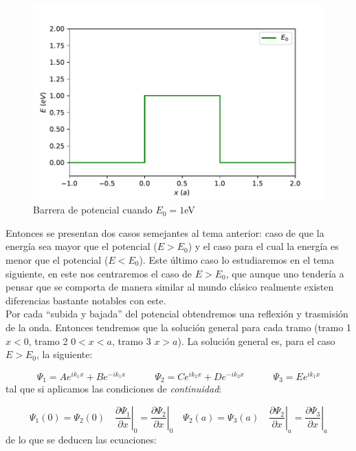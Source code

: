 \documentclass[12pt,a4paper]{article}
\numberwithin{equation}{section}
\numberwithin{figure}{section}
\newcommand{\parciales}[2]{\frac{\partial #1}{\partial #2}}
\newcommand{\tquad}{\quad \quad \quad}
\begin{document}
\begin{figure}[h!] \centering
\includegraphics[scale=0.7]{barrera-potencial.pdf}
\caption{Barrera de potencial cuando $E_0 = 1$eV}
\label{Fig:25.01-Barrera}
\end{figure}
 
Entonces se presentan dos casos semejantes al tema anterior: caso de que la energía sea mayor que el potencial ($E>E_0$) y el caso para el cual la energía es menor que el potencial ($E<E_0$). Este último caso lo estudiaremos en el tema siguiente, en este nos centraremos el caso de $E>E_0$, que aunque uno tendería a pensar que se comporta de manera similar al mundo clásico realmente existen diferencias bastante notables con este. \\

Por cada ``subida y bajada'' del potencial obtendremos una reflexión y trasmisión de la onda. Entonces tendremos que la solución general para cada tramo (tramo 1 $x<0$, tramo 2 $0<x<a$, tramo 3 $x>a$). La solución general es, para el caso $E>E_0$, la siguiente:

\begin{equation}
\Psi_1 = A e^{ik_1x} +  B e^{-ik_1x}  \tquad
\Psi_2 = C e^{ik_2x} +  D e^{-ik_2x}  \tquad
\Psi_3 = E e^{ik_1x} 
\end{equation}
tal que si aplicamos las condiciones de \textit{continuidad}:

\begin{equation}
\Psi_1 (0) = \Psi_2 (0) \quad \left. \parciales{\Psi_1}{x} \right|_0 = \left. \parciales{\Psi_2}{x} \right|_0  \quad 
\Psi_2 (a) = \Psi_3 (a) \quad \left. \parciales{\Psi_2}{x} \right|_a = \left. \parciales{\Psi_3}{x} \right|_a
\end{equation}
de lo que se deducen las ecuaciones:
\end{document}

